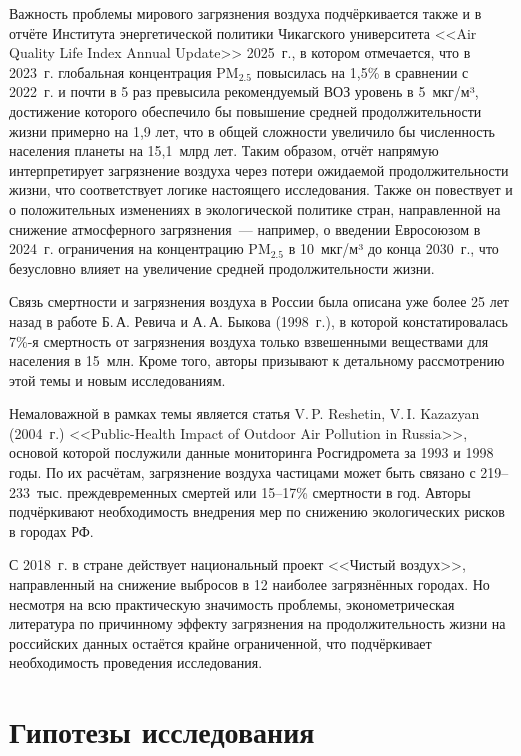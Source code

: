 \documentclass[11pt,a4paper]{article}
\begin{document}
\medskip

Важность проблемы мирового загрязнения воздуха подчёркивается также и в отчёте Института энергетической политики Чикагского университета <<Air Quality Life Index Annual Update>> 2025~г., в котором отмечается, что в 2023~г. глобальная концентрация $\text{PM}_{2.5}$ повысилась на 1{,}5\% в сравнении с 2022~г. и почти в 5 раз превысила рекомендуемый ВОЗ уровень в 5~мкг/м³, достижение которого обеспечило бы повышение средней продолжительности жизни примерно на 1{,}9 лет, что в общей сложности увеличило бы численность населения планеты на 15{,}1~млрд лет. Таким образом, отчёт напрямую интерпретирует загрязнение воздуха через потери ожидаемой продолжительности жизни, что соответствует логике настоящего исследования. Также он повествует и о положительных изменениях в экологической политике стран, направленной на снижение атмосферного загрязнения~--- например, о введении Евросоюзом в 2024~г. ограничения на концентрацию $\text{PM}_{2.5}$ в 10~мкг/м³ до конца 2030~г., что безусловно влияет на увеличение средней продолжительности жизни.

\medskip

Связь смертности и загрязнения воздуха в России была описана уже более 25 лет назад в работе Б.\,А. Ревича и А.\,А. Быкова (1998~г.), в которой констатировалась 7\%-я смертность от загрязнения воздуха только взвешенными веществами для населения в 15~млн. Кроме того, авторы призывают к детальному рассмотрению этой темы и новым исследованиям.

Немаловажной в рамках темы является статья V.\,P. Reshetin, V.\,I. Kazazyan (2004~г.) <<Public-Health Impact of Outdoor Air Pollution in Russia>>, основой которой послужили данные мониторинга Росгидромета за 1993 и 1998 годы. По их расчётам, загрязнение воздуха частицами может быть связано с 219--233~тыс. преждевременных смертей или 15--17\% смертности в год. Авторы подчёркивают необходимость внедрения мер по снижению экологических рисков в городах РФ.

\medskip

С 2018~г. в стране действует национальный проект <<Чистый воздух>>, направленный на снижение выбросов в 12 наиболее загрязнённых городах. Но несмотря на всю практическую значимость проблемы, эконометрическая литература по причинному эффекту загрязнения на продолжительность жизни на российских данных остаётся крайне ограниченной, что подчёркивает необходимость проведения исследования.

\section*{Гипотезы исследования}
\end{document}
